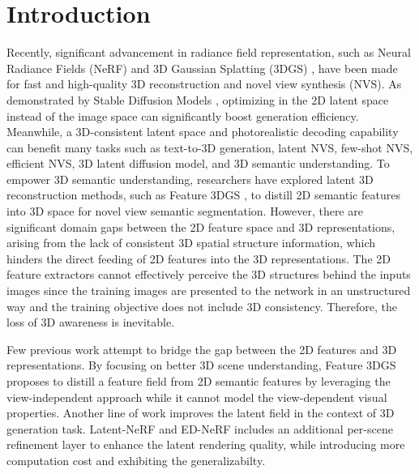 
\section{Introduction}
Recently, significant advancement in radiance field representation, such as Neural Radiance Fields (NeRF) \citep{mildenhall2020nerf} and 3D Gaussian Splatting (3DGS) \citep{kerbl3Dgaussians},  have been made for fast and high-quality 3D reconstruction and novel view synthesis (NVS). As demonstrated by Stable Diffusion Models \citep{rombach2021highresolution}, optimizing in the 2D latent space instead of the image space can significantly boost generation efficiency. Meanwhile, a 3D-consistent latent space and photorealistic decoding capability can benefit many tasks such as text-to-3D generation, latent NVS, few-shot NVS, efficient NVS, 3D latent diffusion model, and 3D semantic understanding. 
To empower 3D semantic understanding, researchers have explored latent 3D reconstruction methods, such as Feature 3DGS \citep{zhou2024feature}, to distill 2D semantic features into 3D space for novel view semantic segmentation.
However, there are significant domain gaps between the 2D feature space and 3D representations, arising from the lack of consistent 3D spatial structure information, which hinders the direct feeding of 2D features into the 3D representations. The 2D feature extractors cannot effectively perceive the 3D structures behind the inputs images since the training images are presented to the network in an unstructured way and the training objective does not include 3D consistency.
Therefore, the loss of 3D awareness is inevitable.

Few previous work attempt to bridge the gap between the 2D features and 3D representations. By focusing on better 3D scene understanding, Feature 3DGS \citep{zhou2024feature} proposes to distill a feature field from 2D semantic features by leveraging the view-independent approach while it cannot model the view-dependent visual properties. Another line of work improves the latent field in the context of 3D generation task. Latent-NeRF \citep{metzer2022latent} and ED-NeRF \citep{park2023ed} includes an additional per-scene refinement layer to enhance the latent rendering quality, while introducing more computation cost and exhibiting the generalizabilty. 

